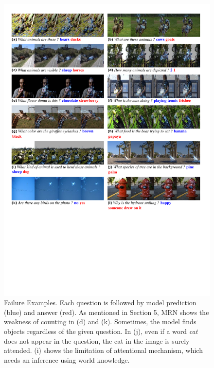 \begin{figure}[ht!]
\centering
\includegraphics[width=\linewidth]{fail_reduced}
\caption{Failure Examples. Each question is followed by model prediction (blue) and answer (red). As mentioned in Section 5, MRN shows the weakness of counting in (d) and (k). Sometimes, the model finds objects regardless of the given question. In (j), even if a word \textit{cat} does not appear in the question, the cat in the image is surely attended. (i) shows the limitation of attentional mechanism, which needs an inference using world knowledge.}
\label{fig:more}
\end{figure}

